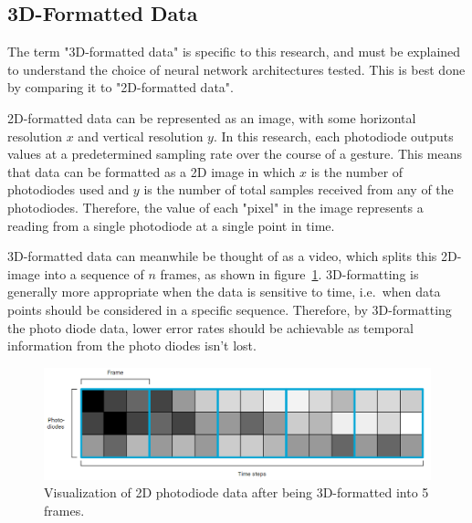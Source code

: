 \subsection{3D-Formatted Data}\label{subsec:3d-formatted-data}
The term "3D-formatted data" is specific to this research, and must be explained to understand the choice of neural network architectures tested.
This is best done by comparing it to "2D-formatted data".

2D-formatted data can be represented as an image, with some horizontal resolution $x$ and vertical resolution $y$.
In this research, each photodiode outputs values at a predetermined sampling rate over the course of a gesture.
This means that data can be formatted as a 2D image in which $x$ is the number of photodiodes used and $y$ is the number of total samples received from any of the photodiodes.
Therefore, the value of each "pixel" in the image represents a reading from a single photodiode at a single point in time.

3D-formatted data can meanwhile be thought of as a video, which splits this 2D-image into a sequence of $n$ frames, as shown in figure~\ref{fig:3d-data}\@.
3D-formatting is generally more appropriate when the data is sensitive to time, i.e.\ when data points should be considered in a specific sequence.
Therefore, by 3D-formatting the photo diode data, lower error rates should be achievable as temporal information from the photo diodes isn't lost.

\begin{figure}[h]
    \centering
    \captionsetup{justification=centering}
    \includegraphics[width=\linewidth]{figures/3d_data}
    \caption{Visualization of 2D photodiode data after being 3D-formatted into 5 frames.}
    \label{fig:3d-data}
\end{figure}